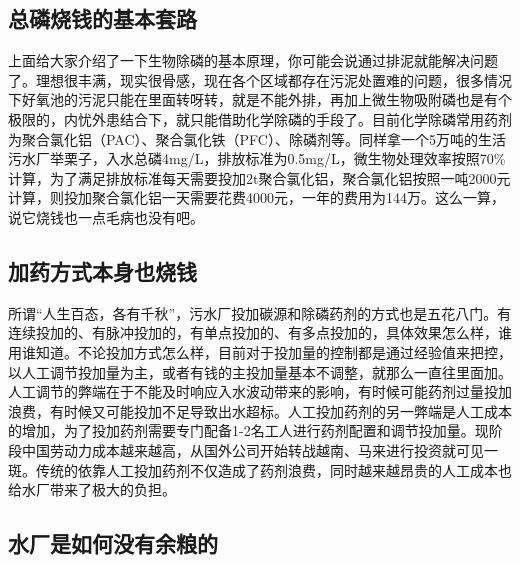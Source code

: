 \documentclass[
]{book}
\begin{document}
\hypertarget{ux603bux78f7ux70e7ux94b1ux7684ux57faux672cux5957ux8def}{%
\subsection{总磷烧钱的基本套路}\label{ux603bux78f7ux70e7ux94b1ux7684ux57faux672cux5957ux8def}}

上面给大家介绍了一下生物除磷的基本原理，你可能会说通过排泥就能解决问题了。理想很丰满，现实很骨感，现在各个区域都存在污泥处置难的问题，很多情况下好氧池的污泥只能在里面转呀转，就是不能外排，再加上微生物吸附磷也是有个极限的，内忧外患结合下，就只能借助化学除磷的手段了。目前化学除磷常用药剂为聚合氯化铝（PAC）、聚合氯化铁（PFC）、除磷剂等。同样拿一个5万吨的生活污水厂举栗子，入水总磷4mg/L，排放标准为0.5mg/L，微生物处理效率按照70\%计算，为了满足排放标准每天需要投加2t聚合氯化铝，聚合氯化铝按照一吨2000元计算，则投加聚合氯化铝一天需要花费4000元，一年的费用为144万。这么一算，说它烧钱也一点毛病也没有吧。

\hypertarget{ux52a0ux836fux65b9ux5f0fux672cux8eabux4e5fux70e7ux94b1}{%
\subsection{加药方式本身也烧钱}\label{ux52a0ux836fux65b9ux5f0fux672cux8eabux4e5fux70e7ux94b1}}

所谓``人生百态，各有千秋''，污水厂投加碳源和除磷药剂的方式也是五花八门。有连续投加的、有脉冲投加的，有单点投加的、有多点投加的，具体效果怎么样，谁用谁知道。不论投加方式怎么样，目前对于投加量的控制都是通过经验值来把控，以人工调节投加量为主，或者有钱的主投加量基本不调整，就那么一直往里面加。人工调节的弊端在于不能及时响应入水波动带来的影响，有时候可能药剂过量投加浪费，有时候又可能投加不足导致出水超标。人工投加药剂的另一弊端是人工成本的增加，为了投加药剂需要专门配备1-2名工人进行药剂配置和调节投加量。现阶段中国劳动力成本越来越高，从国外公司开始转战越南、马来进行投资就可见一斑。传统的依靠人工投加药剂不仅造成了药剂浪费，同时越来越昂贵的人工成本也给水厂带来了极大的负担。

\hypertarget{ux6c34ux5382ux662fux5982ux4f55ux6ca1ux6709ux4f59ux7caeux7684}{%
\subsection{水厂是如何没有余粮的}\label{ux6c34ux5382ux662fux5982ux4f55ux6ca1ux6709ux4f59ux7caeux7684}}
\end{document}
